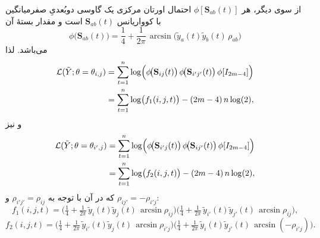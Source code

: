 \begin{اثبات}
	از سوی دیگر، هر \(\phi[\mathbf{S}_{ab}(t)]\) احتمال اورتان مرکزی یک گاوسی دوبُعدیِ صفرمیانگین با کوواریانس \(\mathbf{S}_{ab}(t)\) است و مقدار بستهٔ آن
	\begin{equation}
	\phi\!\big(\mathbf{S}_{ab}(t)\big)
	=\frac{1}{4}+\frac{1}{2\pi}\,\arcsin\!\big(\tilde y_a(t)\tilde y_b(t)\,\rho_{ab}\big)
	\end{equation}
	می‌باشد. لذا
	\begin{align}
	\mathcal{L}(\tilde Y;\theta=\theta_{i,j})
	&=\sum_{t=1}^{n}\log\!\Big(\phi\!\big(\mathbf{S}_{ij}(t)\big)\,\phi\!\big(\mathbf{S}_{i'j'}(t)\big)\,\phi[I_{2m-4}]\Big) \notag \\
	&=\sum_{t=1}^{n}\log\!\big(f_1(i,j,t)\big)-(2m-4)\,n\log(2),
	\end{align}
	و نیز
	\begin{align}
	\mathcal{L}(\tilde Y;\theta=\theta_{i',j})
	&=\sum_{t=1}^{n}\log\!\Big(\phi\!\big(\mathbf{S}_{i'j}(t)\big)\,\phi\!\big(\mathbf{S}_{ij'}(t)\big)\,\phi[I_{2m-4}]\Big) \notag \\
	&=\sum_{t=1}^{n}\log\!\big(f_2(i,j,t)\big)-(2m-4)\,n\log(2),
	\end{align}
	که در آن با توجه به \(\rho_{i'j'}=\rho_{ij}\) و \(\rho_{ij'}=-\rho_{i'j}\):
	\begin{equation}
	f_1(i,j,t)=\Big(\tfrac{1}{4}+\tfrac{1}{2\pi}\,\tilde y_i(t)\tilde y_j(t)\,\arcsin\rho_{ij}\Big)
	\Big(\tfrac{1}{4}+\tfrac{1}{2\pi}\,\tilde y_{i'}(t)\tilde y_{j'}(t)\,\arcsin\rho_{ij}\Big),
	\end{equation}
	\begin{equation}
	f_2(i,j,t)=\Big(\tfrac{1}{4}+\tfrac{1}{2\pi}\,\tilde y_{i'}(t)\tilde y_{j}(t)\,\arcsin\rho_{i'j}\Big)
	\Big(\tfrac{1}{4}+\tfrac{1}{2\pi}\,\tilde y_{i}(t)\tilde y_{j'}(t)\,\arcsin(-\rho_{i'j})\Big).
	\end{equation}
	

\end{اثبات}
